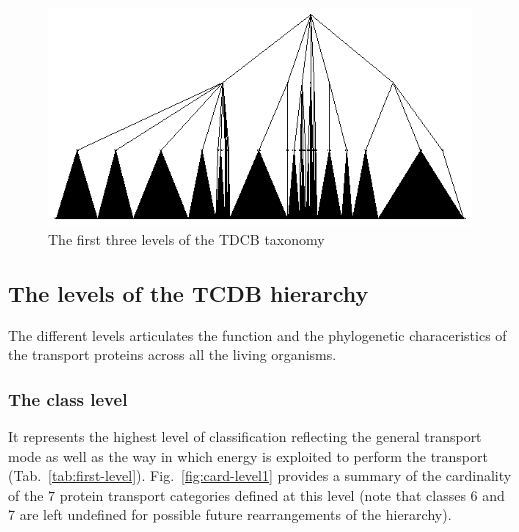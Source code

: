 \documentclass[english]{article}
\begin{document}
\begin{figure}[!h]

\includegraphics[width=15cm]{fig/TCDB3level.ps} 
\caption{The first three levels of the TDCB taxonomy}
\label{fig:three-levels}
\end{figure}

\subsection{The levels of the TCDB hierarchy}
The different levels articulates the function and the phylogenetic characeristics of the transport proteins across all the living organisms.

\subsubsection{The class level}
It represents the highest level of classification reflecting the general transport mode as well as the way in which energy is exploited to perform the transport (Tab.~\ref{tab:first-level}). Fig.~\ref{fig:card-level1} provides a summary of the cardinality of the $7$  protein transport categories defined at this level (note that classes 6 and 7 are left undefined for possible future rearrangements of the hierarchy).
\end{document}
